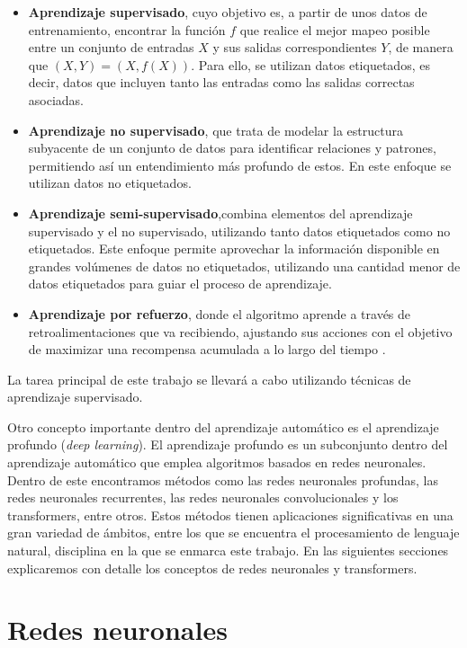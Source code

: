 \documentclass[11pt,spanish,listoffigures,listoftables]{tfgetsinf}
\begin{document}
\begin{itemize}
	\item \textbf{Aprendizaje supervisado}, cuyo objetivo es, a partir de unos datos de entrenamiento, encontrar la función $f$ que realice el mejor mapeo posible entre un conjunto de entradas $X$ y sus salidas correspondientes $Y$, de manera que $(X, Y) = (X, f(X))$. Para ello, se utilizan datos etiquetados, es decir, datos que incluyen tanto las entradas como las salidas correctas asociadas.
	\item \textbf{Aprendizaje no supervisado}, que trata de modelar la estructura subyacente de un conjunto de datos para identificar relaciones y patrones, permitiendo así un entendimiento más profundo de estos. En este enfoque se utilizan datos no etiquetados.
	\item \textbf{Aprendizaje semi-supervisado},combina elementos del aprendizaje supervisado y el no supervisado, utilizando tanto datos etiquetados como no etiquetados. Este enfoque permite aprovechar la información disponible en grandes volúmenes de datos no etiquetados, utilizando una cantidad menor de datos etiquetados para guiar el proceso de aprendizaje.
	\item \textbf{Aprendizaje por refuerzo}, donde el algoritmo aprende a través de retroalimentaciones que va recibiendo, ajustando sus acciones con el objetivo de maximizar una recompensa acumulada a lo largo del tiempo \cite{mirtaheri2022machine}.

\end{itemize}

La tarea principal de este trabajo se llevará a cabo utilizando técnicas de aprendizaje supervisado.

Otro concepto importante dentro del aprendizaje automático es el aprendizaje profundo (\textit{deep learning}). El aprendizaje profundo es un subconjunto dentro del aprendizaje automático que emplea algoritmos basados en redes neuronales. Dentro de este encontramos métodos como las redes neuronales profundas, las redes neuronales recurrentes, las redes neuronales convolucionales y los transformers, entre otros. Estos métodos tienen aplicaciones significativas en una gran variedad de ámbitos, entre los que se encuentra el procesamiento de lenguaje natural, disciplina en la que se enmarca este trabajo. En las siguientes secciones explicaremos con detalle los conceptos de redes neuronales y transformers.

\section{Redes neuronales} \label{redesNeuronales}
\end{document}
